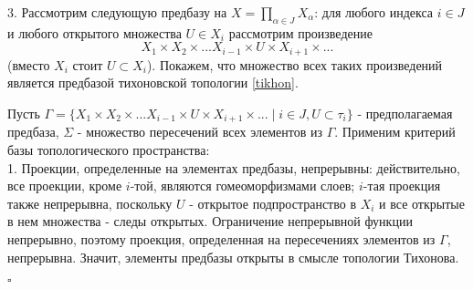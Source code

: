 \documentclass[a4paper]{article}
\begin{document}
3. Рассмотрим следующую предбазу на $X=\prod\limits_{\alpha\in J}X_\alpha$:
для любого индекса $i \in  J$ и любого открытого множества $U \in X_i$
рассмотрим произведение
$$X_1\times X_2\times...X_{i-1}\times U \times X_{i+1}\times ... $$
(вместо $X_i$ стоит  $U\subset X_i$). Покажем, что множество всех
таких произведений является предбазой тихоновской топологии \ref{tikhon}.

Пусть 
$\Gamma = \{X_1\times X_2\times...X_{i-1}\times U \times X_{i+1}\times
...\mid i \in J, U\subset \tau_i\}$ - предполагаемая предбаза, 
$\Sigma$ - множество пересечений всех элементов из  $\Gamma$. 
Применим критерий базы топологического пространства:\\
1. Проекции, определенные на элементах предбазы, непрерывны: 
действительно, все проекции, кроме $i$-той, являются гомеоморфизмами слоев;
$i$-тая проекция также непрерывна, поскольку  $U$ - открытое подпространство 
в  $X_i$ и все открытые в нем множества - следы открытых. Ограничение 
непрерывной функции непрерывно, поэтому проекция, определенная на пересечениях
элементов из  $\Gamma$, непрерывна. Значит, элементы предбазы открыты в смысле
топологии Тихонова. 





$\square$ 
\end{document}
